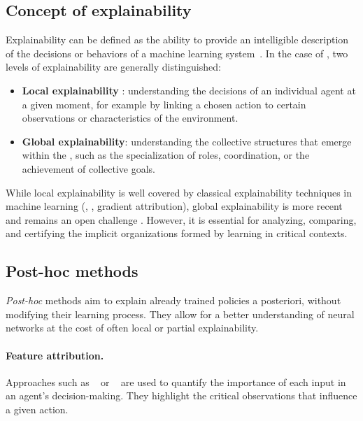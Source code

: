         \subsection{Concept of explainability}

        \noindent
        Explainability can be defined as the ability to provide an intelligible description
        of the decisions or behaviors of a machine learning system~\cite{doshivelez2017rigorous}.
        In the case of , two levels of explainability are generally distinguished:
        \begin{itemize}
          \item \textbf{Local explainability} : understanding the decisions of an individual agent
                at a given moment, for example by linking a chosen action
                to certain observations or characteristics of the environment.
          \item \textbf{Global explainability}: understanding the collective structures
                that emerge within the , such as the specialization
                of roles, coordination, or the achievement of collective goals.
        \end{itemize}

        While local explainability is well covered by classical
        explainability techniques in machine learning (, , gradient attribution),
        global explainability is more recent and remains an open challenge
        \cite{poupart2025perspectives, milani2022maviper}.
        However, it is essential for analyzing, comparing, and certifying
        the implicit organizations formed by learning in critical contexts.

        \subsection{Post-hoc methods}

        \noindent
        \textit{Post-hoc} methods aim to explain already trained policies a posteriori,
        without modifying their learning process.
        They allow for a better understanding of neural networks
        at the cost of often local or partial explainability.

        \paragraph{Feature attribution.}
        Approaches such as ~\cite{bach2015lrp}
        or ~\cite{lundberg2017unified}
        are used to quantify the importance of each input
        in an agent's decision-making.
        They highlight the critical observations
        that influence a given action.

